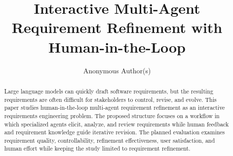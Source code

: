 \documentclass[sigconf,anonymous,review]{acmart}
\title{Interactive Multi-Agent Requirement Refinement with Human-in-the-Loop}
\author{Anonymous Author(s)}
\affiliation{
  \institution{Anonymous Institution}
  \country{Anonymous Country}
}
\begin{document}
\begin{abstract}
Large language models can quickly draft software requirements, but the resulting requirements are often difficult for stakeholders to control, revise, and evolve. This paper studies human-in-the-loop multi-agent requirement refinement as an interactive requirements engineering problem. The proposed structure focuses on a workflow in which specialized agents elicit, analyze, and review requirements while human feedback and requirement knowledge guide iterative revision. The planned evaluation examines requirement quality, controllability, refinement effectiveness, user satisfaction, and human effort while keeping the study limited to requirement refinement.
\end{abstract}



\maketitle



















\appendix



\end{document}
